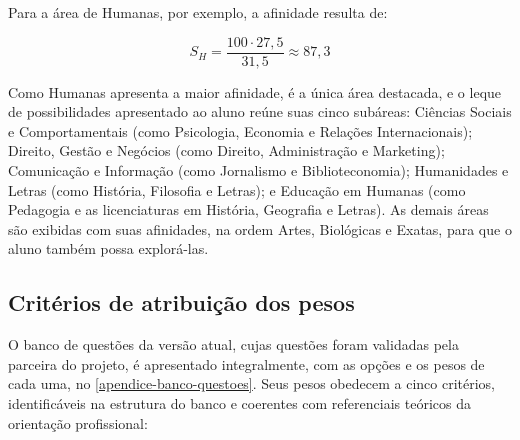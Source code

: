Para a área de Humanas, por exemplo, a afinidade resulta de:

\[
S_H = \frac{100 \cdot 27{,}5}{31{,}5} \approx 87{,}3
\]

\noindent Como Humanas apresenta a maior afinidade, é a única área destacada, e o leque de possibilidades apresentado ao aluno reúne suas cinco subáreas: Ciências Sociais e Comportamentais (como Psicologia, Economia e Relações Internacionais); Direito, Gestão e Negócios (como Direito, Administração e Marketing); Comunicação e Informação (como Jornalismo e Biblioteconomia); Humanidades e Letras (como História, Filosofia e Letras); e Educação em Humanas (como Pedagogia e as licenciaturas em História, Geografia e Letras). As demais áreas são exibidas com suas afinidades, na ordem Artes, Biológicas e Exatas, para que o aluno também possa explorá-las.

\subsection{Critérios de atribuição dos pesos}\label{sec:criterios-pesos}

O banco de questões da versão atual, cujas questões foram validadas pela parceira do projeto, é apresentado integralmente, com as opções e os pesos de cada uma, no \autoref{apendice-banco-questoes}. Seus pesos obedecem a cinco critérios, identificáveis na estrutura do banco e coerentes com referenciais teóricos da orientação profissional:

